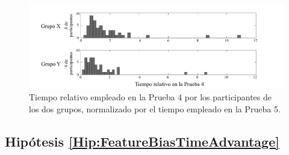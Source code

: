  
\begin{figure}[h!]
\begin{center}
	\includegraphics[scale=.5]{../figuras/brm/results_2_sp.pdf}
\end{center}
\caption{
Tiempo relativo empleado en la Prueba 4 por los participantes de los dos grupos, normalizado por el tiempo empleado en la Prueba 5.
}
\label{fig:results2}
\end{figure}



\subsection{Hipótesis \ref{Hip:FeatureBiasTimeAdvantage}}\label{Results:FeatureBiasTimeAdvantage} 

